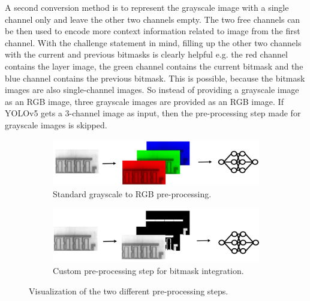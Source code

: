 A second conversion method is to represent the grayscale image with a single channel only and leave the other two channels empty. The two free channels can be then used to encode more context information related to image from the first channel. With the challenge statement in mind, filling up the other two channels with the current and previous bitmasks is clearly helpful e.g. the red channel contains the layer image, the green channel contains the current bitmask and the blue channel contains the previous bitmask. This is possible, because the bitmask images are also single-channel images. So instead of providing a grayscale image as an RGB image, three grayscale images are provided as an RGB image. If YOLOv5 gets a 3-channel image as input, then the pre-processing step made for grayscale images is skipped. \\

\begin{figure}[!h]
\centering
\begin{subfigure}{\textwidth}
  \centering
  \includegraphics[width=\linewidth]{images/implementation/gray_to_rgb}
  \caption{Standard grayscale to RGB pre-processing.}
\end{subfigure}

\begin{subfigure}{\textwidth}
  \centering
  \includegraphics[width=\linewidth]{images/implementation/gray_to_bm}
  \caption{Custom pre-processing step for bitmask integration.}
\end{subfigure}
\caption{Visualization of the two different pre-processing steps.}
\label{}
\end{figure}


